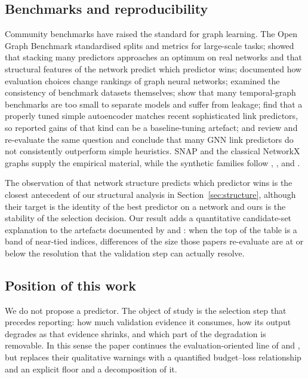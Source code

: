 \documentclass{comjnl}
\begin{document}
\subsection{Benchmarks and reproducibility}

Community benchmarks have raised the standard for graph learning. The Open Graph Benchmark \citep{hu2020open} standardised splits and metrics for large-scale tasks; \citet{ghasemian2020stacking} showed that stacking many predictors approaches an optimum on real networks and that structural features of the network predict which predictor wins; \citet{shchur2018pitfalls} documented how evaluation choices change rankings of graph neural networks; \citet{mara2020benchmarking} examined the consistency of benchmark datasets themselves; \citet{huang2023tgb} show that many temporal-graph benchmarks are too small to separate models and suffer from leakage; \citet{ma2025reconsidering} find that a properly tuned simple autoencoder matches recent sophisticated link predictors, so reported gains of that kind can be a baseline-tuning artefact; and \citet{liang2026heuristics} review and re-evaluate the same question and conclude that many GNN link predictors do not consistently outperform simple heuristics. SNAP \citep{leskovec2014snap,leskovec2007graph} and the classical NetworkX graphs \citep{zachary1977information,padgett1993robust,knuth1993stanford,davis1941deep} supply the empirical material, while the synthetic families follow \citet{erdos1960evolution}, \citet{barabasi1999emergence}, \citet{watts1998collective} and \citet{holland1983stochastic}.

The observation of \citet{ghasemian2020stacking} that network structure predicts which predictor wins is the closest antecedent of our structural analysis in Section~\ref{sec:structure}, although their target is the identity of the best predictor on a network and ours is the stability of the selection decision. Our result adds a quantitative candidate-set explanation to the artefacts documented by \citet{ma2025reconsidering} and \citet{liang2026heuristics}: when the top of the table is a band of near-tied indices, differences of the size those papers re-evaluate are at or below the resolution that the validation step can actually resolve.

\subsection{Position of this work}

We do not propose a predictor. The object of study is the selection step that precedes reporting: how much validation evidence it consumes, how its output degrades as that evidence shrinks, and which part of the degradation is removable. In this sense the paper continues the evaluation-oriented line of \citet{lichtenwalter2010new} and \citet{yang2015evaluating}, but replaces their qualitative warnings with a quantified budget--loss relationship and an explicit floor and a decomposition of it.
\end{document}
